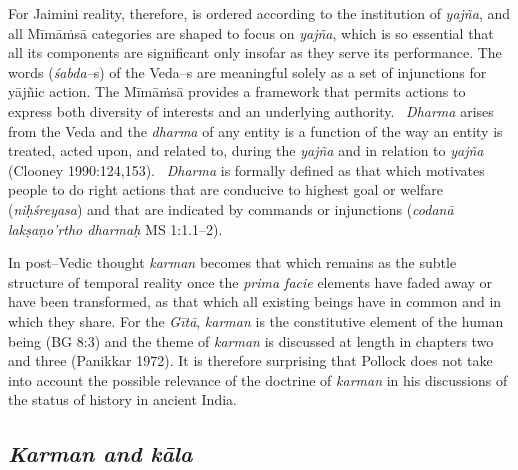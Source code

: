 For Jaimini reality, therefore, is ordered according to the institution of \textit{yajña}, and all Mīmāṁsā categories are shaped to focus on \textit{yajña}, which is so essential that all its components are significant only insofar as they serve its performance. The words (\textit{śabda–}s) of the Veda–s are meaningful solely as a set of injunctions for yājñic action. The Mīmāṁsā provides a framework that permits actions to express both diversity of interests and an underlying authority.  \textit{Dharma} arises from the Veda and the \textit{dharma} of any entity is a function of the way an entity is treated, acted upon, and related to, during the \textit{yajña} and in relation to \textit{yajña} (Clooney 1990:124,153).  \textit{Dharma} is formally defined as that which motivates people to do right actions that are conducive to highest goal or welfare (\textit{niḥśreyasa}) and that are indicated by commands or injunctions (\textit{codanā lakṣaṇo'rtho dharmaḥ} MS 1:1.1–2).

In post–Vedic thought \textit{karman} becomes that which remains as the subtle structure of temporal reality once the \textit{prima facie} elements have faded away or have been transformed, as that which all existing beings have in common and in which they share. For the \textit{Gītā}, \textit{karman} is the constitutive element of the human being (BG 8:3) and the theme of \textit{karman} is discussed at length in chapters two and three (Panikkar 1972). It is therefore surprising that Pollock does not take into account the possible relevance of the doctrine of \textit{karman} in his discussions of the status of history in ancient India.


\subsection*{\textit{Karman and kāla}}

